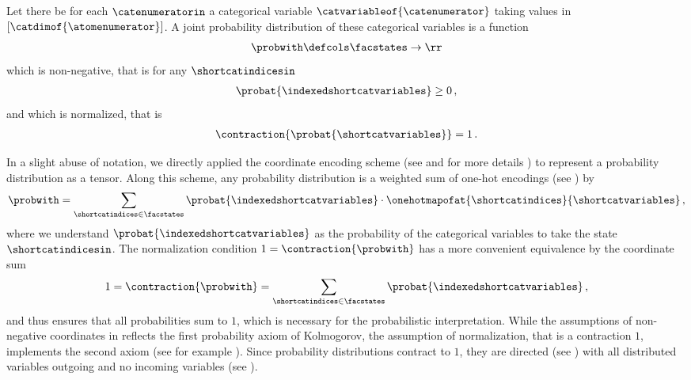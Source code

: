 \begin{definition}
    \label{def:probabilityDistribution} %
    Let there be for each $\catenumeratorin$ a categorical variable $\catvariableof{\catenumerator}$ taking values in $[\catdimof{\atomenumerator}]$.
    A joint probability distribution of these categorical variables is a function
    \begin{align*}
        \probwith \defcols \facstates \rightarrow \rr
    \end{align*}
    which is non-negative, that is for any $\shortcatindicesin$
    \begin{align*}
        \probat{\indexedshortcatvariables} \geq 0 \, ,
    \end{align*}
    and which is normalized, that is
    \begin{align*}
        \contraction{\probat{\shortcatvariables}} = 1 \, .
    \end{align*}
\end{definition}

In a slight abuse of notation, we directly applied the coordinate encoding scheme (see  and for more details ) to represent a probability distribution as a tensor.
Along this scheme, any probability distribution is a weighted sum of one-hot encodings (see ) by
\begin{align*} %
    \probwith = \sum_{\shortcatindices\in\facstates} \probat{\indexedshortcatvariables} \cdot \onehotmapofat{\shortcatindices}{\shortcatvariables} \, ,
\end{align*}
where we understand $\probat{\indexedshortcatvariables}$ as the probability of the categorical variables to take the state $\shortcatindicesin$.
The normalization condition $1=\contraction{\probwith}$ has a more convenient equivalence by the coordinate sum
\begin{align*}
    1 = \contraction{\probwith}
    =  \sum_{\shortcatindices\in\facstates}\probat{\indexedshortcatvariables} \, ,
\end{align*}
and thus ensures that all probabilities sum to $1$, which is necessary for the probabilistic interpretation.
While the assumptions of non-negative coordinates in  reflects the first probability axiom of Kolmogorov, the assumption of normalization, that is a contraction $1$, implements the second axiom (see for example \cite{degroot_probability_2016}).
Since probability distributions contract to $1$, they are directed (see ) with all distributed variables outgoing and no incoming variables (see ).

